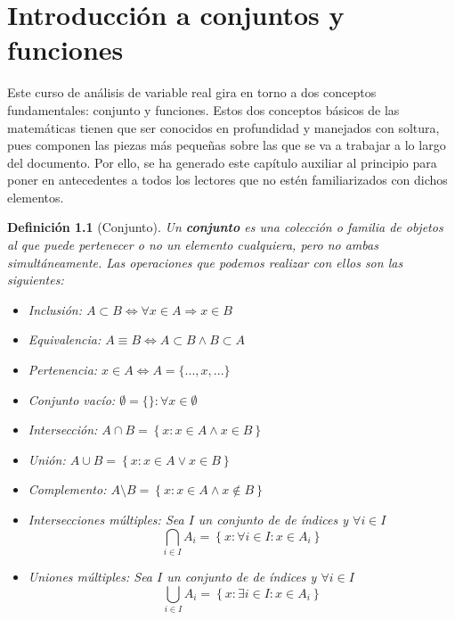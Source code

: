 \documentclass[10pt,a4paper,openright]{book}
\theoremstyle{break}
\newtheorem{defi}{Definición}[chapter]
\begin{document}
\hypersetup{linkcolor=black}
\setcounter{tocdepth}{3}%
\setcounter{secnumdepth}{4}%
\tableofcontents
\hypersetup{linkcolor=blue}

\mainmatter
\chapter{Introducción a conjuntos y funciones}
\label{chap:intro_a_conjuntos_y_funciones}
Este curso de análisis de variable real gira en torno a dos conceptos fundamentales: conjunto y funciones. Estos dos conceptos básicos de las matemáticas tienen que ser conocidos en profundidad y manejados con soltura, pues componen las piezas más pequeñas sobre las que se va  a trabajar a lo largo del documento. Por ello, se ha generado este capítulo auxiliar al principio para poner en antecedentes a todos los lectores que no estén familiarizados con dichos elementos.

\begin{defi}[Conjunto]
Un \textbf{conjunto} es una colección o familia de objetos al que puede pertenecer o no un elemento cualquiera, pero no ambas simultáneamente. Las operaciones que podemos realizar con ellos son las siguientes:
\begin{itemize}
\item Inclusión: $A\subset B \Leftrightarrow \forall x \in A \Rightarrow x \in B$
\item Equivalencia: $A \equiv B \Leftrightarrow A \subset B \wedge B \subset A$
\item Pertenencia: $x \in A \Leftrightarrow A=\{...,x,...\}$
\item Conjunto vacío: $\emptyset=\{\}: \forall x \in \emptyset$
\item Intersección: $A \cap B=\left\lbrace x: x\in A \wedge x\in B \right\rbrace$
\item Unión: $A \cup B=\left\lbrace x: x\in A \vee x\in B \right\rbrace$
\item Complemento: $A \mbox{\textbackslash} B=\left\lbrace x: x\in A \wedge x\notin B \right\rbrace$
\item Intersecciones múltiples: Sea $I$ un conjunto de de índices y $\forall i \in I$
$$\bigcap_{i\in I}A_i=\left\lbrace x: \forall i \in I : x\in A_i\right\rbrace$$
\item Uniones múltiples: Sea $I$ un conjunto de de índices y $\forall i \in I$
$$\bigcup_{i\in I}A_i=\left\lbrace x: \exists i \in I: x\in A_i\right\rbrace$$
\end{itemize}
\end{defi}
\end{document}
